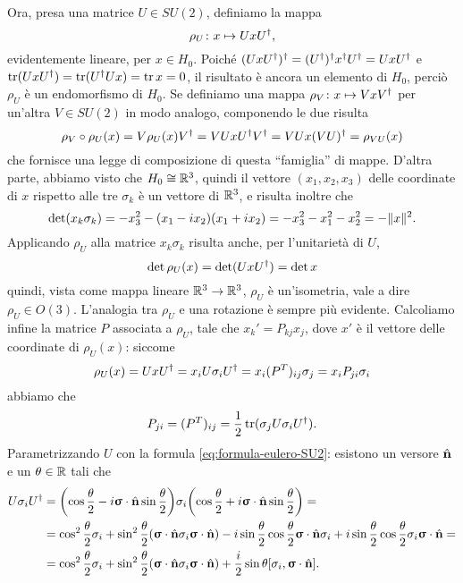 Ora, presa una matrice $U\in SU(2)$, definiamo la mappa
\begin{equation}
	\rho_U\colon x\mapsto UxU^\dagger,
\end{equation}
evidentemente lineare, per $x\in H_0$.
Poich\'e $(UxU^\dagger)^\dagger=(U^\dagger)^\dagger x^\dagger U^\dagger=UxU^\dagger$ e $\operatorname{tr}(UxU^\dagger)=\operatorname{tr}(U^\dagger Ux)=\operatorname{tr} x=0$, il risultato è ancora un elemento di $H_0$, perciò $\rho_U$ è un endomorfismo di $H_0$.
Se definiamo una mappa $\rho_V\colon x\mapsto VxV^\dagger$  per un'altra $V\in SU(2)$ in modo analogo, componendo le due risulta
\begin{equation}
	\rho_V\circ\rho_U(x)=V\rho_U(x)V^\dagger=VUxU^\dagger V^\dagger=VUx(VU)^\dagger=\rho_{VU}(x)
\end{equation}
che fornisce una legge di composizione di questa ``famiglia'' di mappe.
D'altra parte, abbiamo visto che $H_0\cong\mathbb{R}^3$, quindi il vettore $(x_1,x_2,x_3)$ delle coordinate di $x$ rispetto alle tre $\sigma_k$ è un vettore di $\mathbb{R}^3$, e risulta inoltre che
\begin{equation}
	\det(x_k\sigma_k)=-x_3^2-(x_1-ix_2)(x_1+ix_2)=-x_3^2-x_1^2-x_2^2=-\lVert x\rVert^2.
\end{equation}
Applicando $\rho_U$ alla matrice $x_k\sigma_k$ risulta anche, per l'unitarietà di $U$,
\begin{equation}
	\det\rho_U(x)=\det(UxU^\dagger)=\det x
\end{equation}
quindi, vista come mappa lineare $\mathbb{R}^3\to\mathbb{R}^3$, $\rho_U$ è un'isometria, vale a dire $\rho_U\in O(3)$.
L'analogia tra $\rho_U$ e una rotazione è sempre più evidente.
Calcoliamo infine la matrice $P$ associata a $\rho_U$, tale che $x_k'=P_{kj}x_j$, dove $x'$ è il vettore delle coordinate di $\rho_U(x)$: siccome
\begin{equation}
	\rho_U(x)=UxU^\dagger=x_iU\sigma_iU^\dagger=x_i(P^T)_{ij}\sigma_j=x_iP_{ji}\sigma_i
\end{equation}
abbiamo che
\begin{equation}
	P_{ji}=(P^T)_{ij}=\frac12\operatorname{tr}(\sigma_jU\sigma_iU^\dagger).
\end{equation}
Parametrizzando $U$ con la formula \eqref{eq:formula-eulero-SU2}: esistono un versore $\hat{\mathbf{n}}$ e un $\theta\in\mathbb{R}$ tali che
\begin{equation}
	\begin{split}
		U\sigma_iU^\dagger&=\bigg(\!\cos\frac{\theta}2-i{\bm{\upsigma}}\cdot{\hat{\mathbf{n}}}\sin\frac{\theta}2\bigg)\sigma_i\bigg(\!\cos\frac{\theta}2+i{\bm{\upsigma}}\cdot{\hat{\mathbf{n}}}\sin\frac{\theta}2\bigg)=\\
		&=\cos^2\frac{\theta}2\sigma_i+\sin^2\frac{\theta}2({\bm{\upsigma}}\cdot{\hat{\mathbf{n}}}\sigma_i{\bm{\upsigma}}\cdot{\hat{\mathbf{n}}})-i\sin\frac{\theta}2\cos\frac{\theta}2{\bm{\upsigma}}\cdot{\hat{\mathbf{n}}}\sigma_i+i\sin\frac{\theta}2\cos\frac{\theta}2\sigma_i{\bm{\upsigma}}\cdot{\hat{\mathbf{n}}}=\\
		&=\cos^2\frac{\theta}2\sigma_i+\sin^2\frac{\theta}2({\bm{\upsigma}}\cdot{\hat{\mathbf{n}}}\sigma_i{\bm{\upsigma}}\cdot{\hat{\mathbf{n}}})+\frac{i}2\sin\theta[\sigma_i,{\bm{\upsigma}}\cdot{\hat{\mathbf{n}}}].
	\end{split}
\end{equation}
